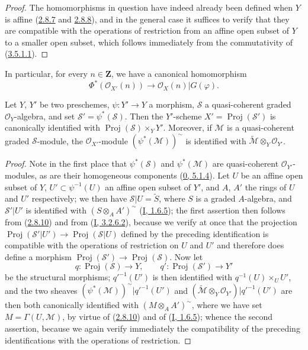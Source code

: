 \begin{proof}
The homomorphisms in question have indeed already been defined when $Y$ is
affine (\hyperref[II.2.8.7]{2.8.7} and
\hyperref[II.2.8.8]{2.8.8}), and in the general case it suffices to verify
that they are compatible with the operations of restriction from an affine
open subset of $Y$ to a smaller open subset, which follows immediately from
the commutativity of (\hyperref[II.3.5.1.1]{3.5.1.1}).
\end{proof}

In particular, for every $n\in\mathbf{Z}$, we have a canonical homomorphism
\[
\label{II.3.5.2.1}
  \Phi^*(\mathcal{O}_{X'}(n))\longrightarrow
  \mathcal{O}_X(n)|G(\varphi).
\tag{3.5.2.1}
\]

\begin{proposition}[3.5.3]
\label{II.3.5.3}
Let $Y$, $Y'$ be two preschemes, $\psi:Y'\to Y$ a morphism,
$\mathcal{S}$ a quasi-coherent graded $\mathcal{O}_Y$-algebra, and set
$\mathcal{S}'=\psi^*(\mathcal{S})$. Then the $Y'$-scheme
$X'=\operatorname{Proj}(\mathcal{S}')$ is canonically identified with
$\operatorname{Proj}(\mathcal{S})\times_Y Y'$. Moreover, if $\mathcal{M}$ is
a quasi-coherent graded $\mathcal{S}$-module, the $\mathcal{O}_{X'}$-module
$(\psi^*(\mathcal{M}))^{\sim}$ is identified with
$\widetilde{\mathcal{M}}\otimes_Y\mathcal{O}_{Y'}$.
\end{proposition}

\begin{proof}
Note in the first place that $\psi^*(\mathcal{S})$ and
$\psi^*(\mathcal{M})$ are quasi-coherent $\mathcal{O}_{Y'}$-modules,
as are their homogeneous components
(\hyperref[0.5.1.4]{0, 5.1.4}). Let $U$ be an affine open subset of $Y$,
$U'\subset\psi^{-1}(U)$ an affine open subset of $Y'$, and $A$, $A'$ the rings
of $U$ and $U'$ respectively; we then have
$\mathcal{S}|U=\widetilde{S}$, where $S$ is a graded $A$-algebra, and
$\mathcal{S}'|U'$ is identified with $(S\otimes_A A')^{\sim}$
(\hyperref[I.1.6.5]{I, 1.6.5}); the first assertion then follows from
(\hyperref[II.2.8.10]{2.8.10}) and from
(\hyperref[I.3.2.6.2]{I, 3.2.6.2}), because we verify at once that the
projection
$\operatorname{Proj}(\mathcal{S}'|U')\to
\operatorname{Proj}(\mathcal{S}|U)$ defined by the preceding identification
is compatible with the operations of restriction on $U$ and $U'$ and
therefore does define a morphism
$\operatorname{Proj}(\mathcal{S}')\to\operatorname{Proj}(\mathcal{S})$.
Now let
\[
  q:\operatorname{Proj}(\mathcal{S})\to Y,
  \qquad q':\operatorname{Proj}(\mathcal{S}')\to Y'
\]
be the structural morphisms; $q'^{-1}(U')$ is then identified with
$q^{-1}(U)\times_U U'$, and the two sheaves
$(\psi^*(\mathcal{M}))^{\sim}|q'^{-1}(U')$ and
$(\widetilde{\mathcal{M}}\otimes_Y\mathcal{O}_{Y'})|q'^{-1}(U')$
are then both canonically identified with $(M\otimes_A A')^{\sim}$, where
we have set $M=\Gamma(U,\mathcal{M})$, by virtue of
(\hyperref[II.2.8.10]{2.8.10}) and of
(\hyperref[I.1.6.5]{I, 1.6.5}); whence the second assertion, because we
again verify immediately the compatibility of the preceding identifications
with the operations of restriction.
\end{proof}

